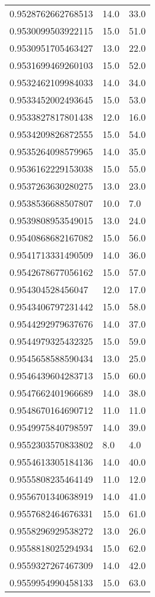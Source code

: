 \begin{center}
\begin{supertabular}[H]{p{0.30\textwidth}p{0.05\textwidth}p{0.05\textwidth}}
0.9528762662768513 & 14.0 & 33.0 \\ 
0.9530099503922115 & 15.0 & 51.0 \\ 
0.9530951705463427 & 13.0 & 22.0 \\ 
0.9531699469260103 & 15.0 & 52.0 \\ 
0.9532462109984033 & 14.0 & 34.0 \\ 
0.9533452002493645 & 15.0 & 53.0 \\ 
0.9533827817801438 & 12.0 & 16.0 \\ 
0.9534209826872555 & 15.0 & 54.0 \\ 
0.9535264098579965 & 14.0 & 35.0 \\ 
0.9536162229153038 & 15.0 & 55.0 \\ 
0.9537263630280275 & 13.0 & 23.0 \\ 
0.9538536688507807 & 10.0 & 7.0 \\ 
0.9539808953549015 & 13.0 & 24.0 \\ 
0.9540868682167082 & 15.0 & 56.0 \\ 
0.9541713331490509 & 14.0 & 36.0 \\ 
0.9542678677056162 & 15.0 & 57.0 \\ 
0.954304528456047 & 12.0 & 17.0 \\ 
0.9543406797231442 & 15.0 & 58.0 \\ 
0.9544292979637676 & 14.0 & 37.0 \\ 
0.9544979325432325 & 15.0 & 59.0 \\ 
0.9545658588590434 & 13.0 & 25.0 \\ 
0.9546439604283713 & 15.0 & 60.0 \\ 
0.9547662401966689 & 14.0 & 38.0 \\ 
0.9548670164690712 & 11.0 & 11.0 \\ 
0.9549975840798597 & 14.0 & 39.0 \\ 
0.9552303570833802 & 8.0 & 4.0 \\ 
0.9554613305184136 & 14.0 & 40.0 \\ 
0.9555808235464149 & 11.0 & 12.0 \\ 
0.9556701340638919 & 14.0 & 41.0 \\ 
0.9557682464676331 & 15.0 & 61.0 \\ 
0.9558296929538272 & 13.0 & 26.0 \\ 
0.9558818025294934 & 15.0 & 62.0 \\ 
0.9559327267467309 & 14.0 & 42.0 \\ 
0.9559954990458133 & 15.0 & 63.0 \\ 

\end{supertabular}
\end{center}
